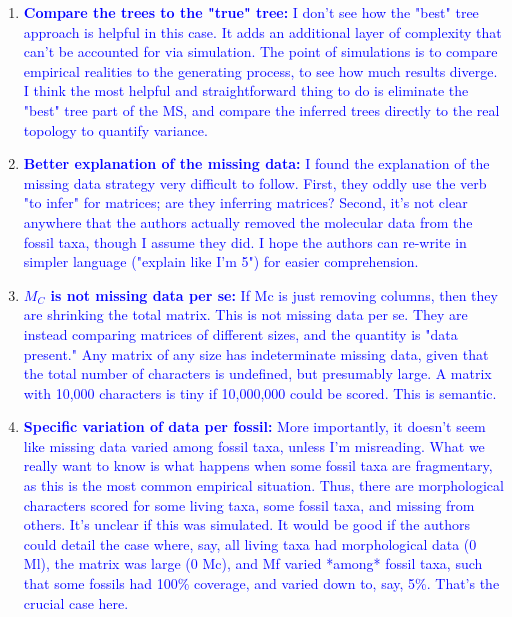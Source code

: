\documentclass[12pt,letterpaper]{article}
\begin{document}
\begin{enumerate}
\item{\textcolor{blue}{\textbf{Compare the trees to the "true" tree:} I don't see how the "best" tree approach is helpful in this case. It adds an additional layer of complexity that can't be accounted for via simulation. The point of simulations is to compare empirical realities to the generating process, to see how much results diverge. I think the most helpful and straightforward thing to do is eliminate the "best" tree part of the MS, and compare the inferred trees directly to the real topology to quantify variance.}}

\item{\textcolor{blue}{\textbf{Better explanation of the missing data:} I found the explanation of the missing data strategy very difficult to follow. First, they oddly use the verb "to infer" for matrices; are they inferring matrices? Second, it's not clear anywhere that the authors actually removed the molecular data from the fossil taxa, though I assume they did. I hope the authors can re-write in simpler language ("explain like I'm 5") for easier comprehension.}}

\item{\textcolor{blue}{\textbf{$M_C$ is not missing data per se:} If Mc is just removing columns, then they are shrinking the total matrix. This is not missing data per se. They are instead comparing matrices of different sizes, and the quantity is "data present." Any matrix of any size has indeterminate missing data, given that the total number of characters is undefined, but presumably large. A matrix with 10,000 characters is tiny if 10,000,000 could be scored. This is semantic.}}

\item{\textcolor{blue}{\textbf{Specific variation of data per fossil:} More importantly, it doesn't seem like missing data varied among fossil taxa, unless I'm misreading. What we really want to know is what happens when some fossil taxa are fragmentary, as this is the most common empirical situation. Thus, there are morphological characters scored for some living taxa, some fossil taxa, and missing from others. It's unclear if this was simulated. It would be good if the authors could detail the case where, say, all living taxa had morphological data (0 Ml), the matrix was large (0 Mc), and Mf varied *among* fossil taxa, such that some fossils had 100\% coverage, and varied down to, say, 5\%. That's the crucial case here.}}
\end{enumerate}
\end{document}

